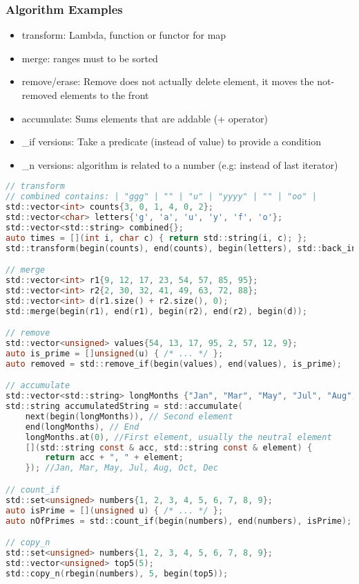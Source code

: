 \subsubsection{Algorithm Examples}
\begin{itemize}
    \item transform: Lambda, function or functor for map
    \item merge: ranges must to be sorted
    \item remove/erase: Remove does not actually delete element, it moves the not-removed elements to the front
    \item accumulate: Sums elements that are addable (+ operator)
    \item \_if versions: Take a predicate (instead of value) to provide a condition
    \item \_n versions: algorithm is related to a number (e.g: instead of last iterator)
        \SubItem{\textcolor{blue}{search\_n, copy\_n, fill\_n, generate\_n, for\_each\_n}}
\end{itemize}
\begin{lstlisting}[style=frame, style= linenumbers, language=C]
// transform
// combined contains: | "ggg" | "" | "u" | "yyyy" | "" | "oo" |
std::vector<int> counts{3, 0, 1, 4, 0, 2};
std::vector<char> letters{'g', 'a', 'u', 'y', 'f', 'o'};
std::vector<std::string> combined{};
auto times = [](int i, char c) { return std::string(i, c); };
std::transform(begin(counts), end(counts), begin(letters), std::back_inserter(combined), times);

// merge
std::vector<int> r1{9, 12, 17, 23, 54, 57, 85, 95};
std::vector<int> r2{2, 30, 32, 41, 49, 63, 72, 88};
std::vector<int> d(r1.size() + r2.size(), 0);
std::merge(begin(r1), end(r1), begin(r2), end(r2), begin(d));

// remove
std::vector<unsigned> values{54, 13, 17, 95, 2, 57, 12, 9};
auto is_prime = []unsigned(u) { /* ... */ };
auto removed = std::remove_if(begin(values), end(values), is_prime);

// accumulate
std::vector<std::string> longMonths {"Jan", "Mar", "May", "Jul", "Aug", "Oct", "Dec"};
std::string accumulatedString = std::accumulate(
    next(begin(longMonths)), // Second element
    end(longMonths), // End
    longMonths.at(0), //First element, usually the neutral element
    [](std::string const & acc, std::string const & element) {
        return acc + ", " + element;
    }); //Jan, Mar, May, Jul, Aug, Oct, Dec

// count_if
std::set<unsigned> numbers{1, 2, 3, 4, 5, 6, 7, 8, 9};
auto isPrime = [](unsigned u) { /* ... */ };
auto nOfPrimes = std::count_if(begin(numbers), end(numbers), isPrime);

// copy_n
std::set<unsigned> numbers{1, 2, 3, 4, 5, 6, 7, 8, 9};
std::vector<unsigned> top5(5);
std::copy_n(rbegin(numbers), 5, begin(top5));
\end{lstlisting}

